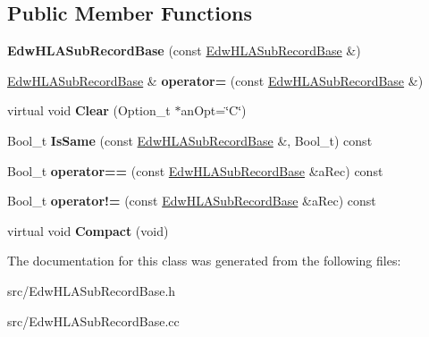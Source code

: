 \subsection*{Public Member Functions}
\begin{DoxyCompactItemize}
\item 
\hypertarget{class_edw_h_l_a_sub_record_base_acfa4a635679450d47e563a7a8966f162}{
{\bfseries EdwHLASubRecordBase} (const \hyperlink{class_edw_h_l_a_sub_record_base}{EdwHLASubRecordBase} \&)}
\label{class_edw_h_l_a_sub_record_base_acfa4a635679450d47e563a7a8966f162}

\item 
\hypertarget{class_edw_h_l_a_sub_record_base_aeac2c8c7fc0cec011880189382d3d6fe}{
\hyperlink{class_edw_h_l_a_sub_record_base}{EdwHLASubRecordBase} \& {\bfseries operator=} (const \hyperlink{class_edw_h_l_a_sub_record_base}{EdwHLASubRecordBase} \&)}
\label{class_edw_h_l_a_sub_record_base_aeac2c8c7fc0cec011880189382d3d6fe}

\item 
\hypertarget{class_edw_h_l_a_sub_record_base_a784620fffaca7587c722c4daaf655e69}{
virtual void {\bfseries Clear} (Option\_\-t $\ast$anOpt=\char`\"{}C\char`\"{})}
\label{class_edw_h_l_a_sub_record_base_a784620fffaca7587c722c4daaf655e69}

\item 
\hypertarget{class_edw_h_l_a_sub_record_base_aae1bf46afd6f73fb99d0224b2d0ec2c8}{
Bool\_\-t {\bfseries IsSame} (const \hyperlink{class_edw_h_l_a_sub_record_base}{EdwHLASubRecordBase} \&, Bool\_\-t) const }
\label{class_edw_h_l_a_sub_record_base_aae1bf46afd6f73fb99d0224b2d0ec2c8}

\item 
\hypertarget{class_edw_h_l_a_sub_record_base_a95e10e5650850e97edea1e59e1037dea}{
Bool\_\-t {\bfseries operator==} (const \hyperlink{class_edw_h_l_a_sub_record_base}{EdwHLASubRecordBase} \&aRec) const }
\label{class_edw_h_l_a_sub_record_base_a95e10e5650850e97edea1e59e1037dea}

\item 
\hypertarget{class_edw_h_l_a_sub_record_base_ab1d0a4ebfde03fb8c5ea2c02466c49a2}{
Bool\_\-t {\bfseries operator!=} (const \hyperlink{class_edw_h_l_a_sub_record_base}{EdwHLASubRecordBase} \&aRec) const }
\label{class_edw_h_l_a_sub_record_base_ab1d0a4ebfde03fb8c5ea2c02466c49a2}

\item 
\hypertarget{class_edw_h_l_a_sub_record_base_ad986542ddb9d91fd1551c091b946a8f7}{
virtual void {\bfseries Compact} (void)}
\label{class_edw_h_l_a_sub_record_base_ad986542ddb9d91fd1551c091b946a8f7}

\end{DoxyCompactItemize}


The documentation for this class was generated from the following files:\begin{DoxyCompactItemize}
\item 
src/EdwHLASubRecordBase.h\item 
src/EdwHLASubRecordBase.cc\end{DoxyCompactItemize}

